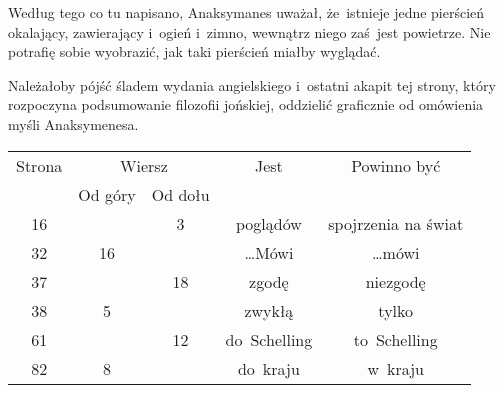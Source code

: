 \documentclass[a4paper,11pt]{article}
\numberwithin{equation}{section}
\begin{document}
\noindent
{} Według tego co tu napisano, Anaksymanes uważał,
że~istnieje jedne pierścień okalający, zawierający i~ogień i~zimno,
wewnątrz niego zaś~jest powietrze. Nie potrafię sobie wyobrazić, jak
taki pierścień miałby wyglądać.

\VerSpaceFour





\noindent
{} Należałoby pójść śladem wydania angielskiego i~ostatni
akapit tej strony, który rozpoczyna podsumowanie filozofii jońskiej,
oddzielić graficznie od omówienia myśli Anaksymenesa.





\newpage



\begin{center}

  \begin{tabular}{|c|c|c|c|c|}
    \hline
    Strona & \multicolumn{2}{c|}{Wiersz} & Jest
                              & Powinno być \\ \cline{2-3}
    & Od góry & Od dołu & & \\
    \hline
    16  & &  3 & poglądów & spojrzenia na świat \\
    32  & 16 & & \ldots Mówi & \ldots mówi \\
    37  & & 18 & zgodę & niezgodę \\
    38  &  5 & & zwykłą & tylko \\
    61 & & 12 & do~Schelling & to~Schelling \\
    82 &  8 & & do~kraju & w~kraju \\
    \hline
  \end{tabular}

\end{center}

\VerSpaceTwo
\end{document}
